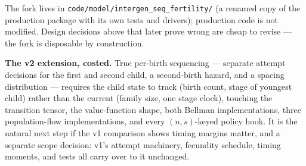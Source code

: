 \documentclass[11pt]{article}
\begin{document}
The fork lives in \texttt{code/model/intergen\_seq\_fertility/} (a renamed
copy of the production package with its own tests and drivers); production
code is not modified. Design decisions above that later prove wrong are
cheap to revise --- the fork is disposable by construction.

\textbf{The v2 extension, costed.} True per-birth sequencing --- separate
attempt decisions for the first and second child, a second-birth hazard,
and a spacing distribution --- requires the child state to track (birth
count, stage of youngest child) rather than the current (family size, one
stage clock), touching the transition tensor, the value-function shape,
both Bellman implementations, three population-flow implementations, and
every $(n,s)$-keyed policy hook. It is the natural next step if the v1
comparison shows timing margins matter, and a separate scope decision: v1's
attempt machinery, fecundity schedule, timing moments, and tests all carry
over to it unchanged.
\end{document}
